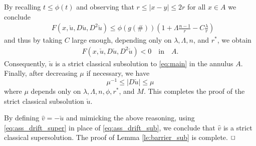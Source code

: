 \documentclass[12pt]{article}
\numberwithin{komcounter}{section}
\begin{document}
%
By recalling $t \leq \phi(t)$ and observing that $r \leq |x-y| \leq 2r$ for all $x \in A$ we conclude
%
\begin{align*}%
&F(x,\check u,D\check u,D^2\check u) \leq \phi\left(g\left(\#\right)\right) \left(1 + \Lambda \frac{n - 1}{r} - C \frac{\lambda}{r} \right)
\end{align*}
%
and thus by taking $C$ large enough, depending only on $\lambda, \Lambda, n$, and $r^\ast$, we obtain
%
\begin{align*}%
F(x,\check u,D\check u,D^2\check u) < 0 \quad \text{in} \quad A.
\end{align*}
%
Consequently, $\check{u}$ is a strict classical subsolution to \eqref{eq:main} in the annulus $A$.
%
Finally, after decreasing $\mu$ if necessary, we have
$$
\mu^{-1} \leq \vert D\check u \vert \leq  \mu
$$
%
where $\mu$ depends only on $\lambda, \Lambda, n, \phi, r^\ast$, and $M$.
This completes the proof of the strict classical subsolution $\check{u}$.












By defining $\hat{v} = - \check u$ and mimicking the above reasoning, using \eqref{eq:ass_drift_super} in place of
\eqref{eq:ass_drift_sub}, we conclude that $\hat{v}$ is a strict classical supersolution. The proof of Lemma \ref{le:barrier_sub} is complete.
$\hfill \Box$ \\
\end{document}
